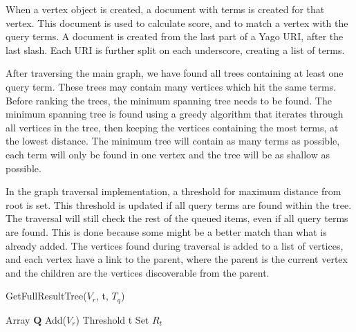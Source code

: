 When a vertex object is created, a document with terms is created for that vertex. This document is used to calculate score, and to match a vertex with the query terms. A document is created from the last part of a Yago URI, after the last slash. Each URI is further split on each underscore, creating a list of terms.

After traversing the main graph, we have found all trees containing at least one query term. These trees may contain many vertices which hit the same terms. Before ranking the trees, the minimum spanning tree needs to be found. The minimum spanning tree is found using a greedy algorithm that iterates through all vertices in the tree, then keeping the vertices containing the most terms, at the lowest distance. The minimum tree will contain as many terms as possible, each term will only be found in one vertex and the tree will be as shallow as possible.

In the graph traversal implementation, a threshold for maximum distance from root is set. This threshold is updated if all query terms are found within the tree. The traversal will still check the rest of the queued items, even if all query terms are found. This is done because some might be a better match than what is already added. The vertices found during traversal is added to a list of vertices, and each vertex have a link to the parent, where the parent is the current vertex and the children are the vertices discoverable from the parent.

\begin{algorithm}[H]
    \caption{GetFullResultTree($V_r$, t, $T_q$)}
    \label{fullRT}
    \SetAlgoLined
    Array $\mathbf{Q}$ Add($V_r$)\; Threshold t\; Set $R_t$\;
\end{algorithm}

